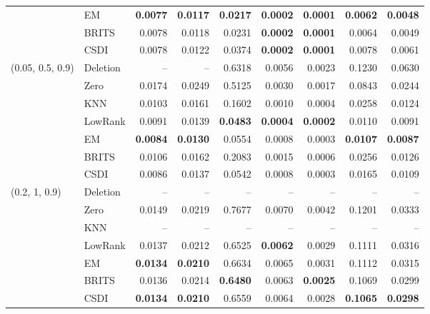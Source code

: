 {\begin{tabular}{@{}llrrrrrrr@{}}
 & EM & \textbf{0.0077} & \textbf{0.0117} & \textbf{0.0217} & \textbf{0.0002} & \textbf{0.0001} & \textbf{0.0062} & \textbf{0.0048} \\
 & BRITS & 0.0078 & 0.0118 & 0.0231 & \textbf{0.0002} & \textbf{0.0001} & 0.0064 & 0.0049 \\
 & CSDI & 0.0078 & 0.0122 & 0.0374 & \textbf{0.0002} & \textbf{0.0001} & 0.0078 & 0.0061 \\
\midrule
(0.05, 0.5, 0.9) & Deletion & -- & -- & 0.6318 & 0.0056 & 0.0023 & 0.1230 & 0.0630 \\
 & Zero & 0.0174 & 0.0249 & 0.5125 & 0.0030 & 0.0017 & 0.0843 & 0.0244 \\
 & KNN & 0.0103 & 0.0161 & 0.1602 & 0.0010 & 0.0004 & 0.0258 & 0.0124 \\
 & LowRank & 0.0091 & 0.0139 & \textbf{0.0483} & \textbf{0.0004} & \textbf{0.0002} & 0.0110 & 0.0091 \\
 & EM & \textbf{0.0084} & \textbf{0.0130} & 0.0554 & 0.0008 & 0.0003 & \textbf{0.0107} & \textbf{0.0087} \\
 & BRITS & 0.0106 & 0.0162 & 0.2083 & 0.0015 & 0.0006 & 0.0256 & 0.0126 \\
 & CSDI & 0.0086 & 0.0137 & 0.0542 & 0.0008 & 0.0003 & 0.0165 & 0.0109 \\
\midrule
(0.2, 1, 0.9) & Deletion & -- & -- & -- & -- & -- & -- & -- \\
 & Zero & 0.0149 & 0.0219 & 0.7677 & 0.0070 & 0.0042 & 0.1201 & 0.0333 \\
 & KNN & -- & -- & -- & -- & -- & -- & -- \\
 & LowRank & 0.0137 & 0.0212 & 0.6525 & \textbf{0.0062} & 0.0029 & 0.1111 & 0.0316 \\
 & EM & \textbf{0.0134} & \textbf{0.0210} & 0.6634 & 0.0065 & 0.0031 & 0.1112 & 0.0315 \\
 & BRITS & 0.0136 & 0.0214 & \textbf{0.6480} & 0.0063 & \textbf{0.0025} & 0.1069 & 0.0299 \\
 & CSDI & \textbf{0.0134} & \textbf{0.0210} & 0.6559 & 0.0064 & 0.0028 & \textbf{0.1065} & \textbf{0.0298} \\
\bottomrule
\end{tabular}}
